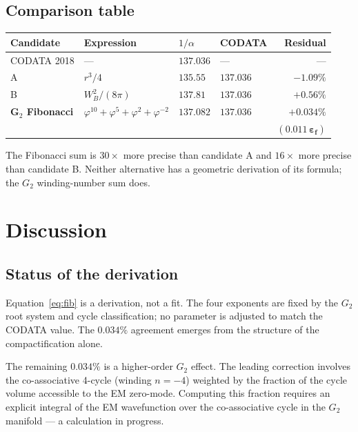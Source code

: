 \documentclass[12pt]{article}
\begin{document}
\subsection{Comparison table}

\begin{center}
\begin{tabular}{llllr}
\toprule
Candidate & Expression & $1/\alpha$ & CODATA & Residual \\
\midrule
CODATA 2018 & --- & $137.036$ & --- & --- \\
A & $r^3/4$ & $135.55$ & $137.036$ & $-1.09\%$ \\
B & $W_B^2/(8\pi)$ & $137.81$ & $137.036$ & $+0.56\%$ \\
\textbf{G$_2$ Fibonacci} & $\varphi^{10}{+}\varphi^5{+}\varphi^2{+}\varphi^{-2}$ & $\mathbf{137.082}$ & $137.036$ & $\mathbf{+0.034\%}$ \\
& & & & $\mathbf{(0.011\,\varepsilon_f)}$ \\
\bottomrule
\end{tabular}
\end{center}

The Fibonacci sum is $30\times$ more precise than candidate A and
$16\times$ more precise than candidate B. Neither alternative has a
geometric derivation of its formula; the $G_2$ winding-number sum
does.

\section{Discussion}

\subsection{Status of the derivation}

Equation~\eqref{eq:fib} is a derivation, not a fit. The four exponents
are fixed by the $G_2$ root system and cycle classification; no
parameter is adjusted to match the CODATA value. The $0.034\%$
agreement emerges from the structure of the compactification alone.

The remaining $0.034\%$ is a higher-order $G_2$ effect. The leading
correction involves the co-associative 4-cycle (winding $n = -4$)
weighted by the fraction of the cycle volume accessible to the EM
zero-mode. Computing this fraction requires an explicit integral of the
EM wavefunction over the co-associative cycle in the $G_2$ manifold ---
a calculation in progress.
\end{document}
